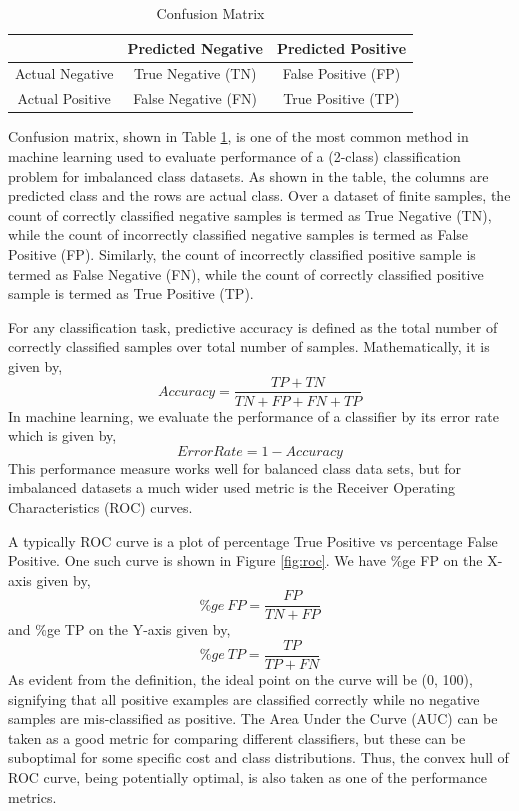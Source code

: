 \documentclass[10pt,journal,compsoc]{IEEEtran}
\begin{document}
\begin{table}[!t]
    \centering
    \begin{tabular}{|c||c|c|}
    	\hline
         & Predicted Negative & Predicted Positive  \\ \hline \hline  
        Actual Negative & True Negative (TN) & False Positive (FP) \\ \hline
        Actual Positive & False Negative (FN) & True Positive (TP) \\ \hline 
    \end{tabular}
    \caption{Confusion Matrix}
    \label{tab:confmat}
\end{table}

Confusion matrix, shown in Table \ref{tab:confmat}, is one of the most common method in machine learning used to evaluate performance of a (2-class) classification problem for imbalanced class datasets.
As shown in the table, the columns are predicted class and the rows are actual class. 
Over a dataset of finite samples, the count of correctly classified negative samples is termed as True Negative (TN), while the count of incorrectly classified negative samples is termed as False Positive (FP).
Similarly, the count of incorrectly classified positive sample is termed as False Negative (FN), while the count of correctly classified positive sample is termed as True Positive (TP).


For any classification task, predictive accuracy is defined as the total number of correctly classified samples over total number of samples. 
Mathematically, it is given by, $$ Accuracy = \frac{TP + TN}{TN + FP + FN + TP}$$
In machine learning, we evaluate the performance of a classifier by its error rate which is given by, $$Error Rate = 1 - Accuracy$$
This performance measure works well for balanced class data sets, but for imbalanced datasets a much wider used metric is the Receiver Operating Characteristics (ROC) curves. 

A typically ROC curve is a plot of percentage True Positive vs percentage False Positive. 
One such curve is shown in Figure \ref{fig:roc}.
We have \%ge FP on the X-axis given by, $$\%ge~FP = \frac{FP}{TN + FP}$$
and \%ge TP on the Y-axis given by, $$\%ge~TP = \frac{TP}{TP + FN}$$
As evident from the definition, the ideal point on the curve will be (0, 100), signifying that all positive examples are classified correctly while no negative samples are mis-classified as positive.
The Area Under the Curve (AUC) can be taken as a good metric for comparing different classifiers, but these can be suboptimal for some specific cost and class distributions.
Thus, the convex hull of ROC curve, being potentially optimal, is also taken as one of the performance metrics.
\end{document}
